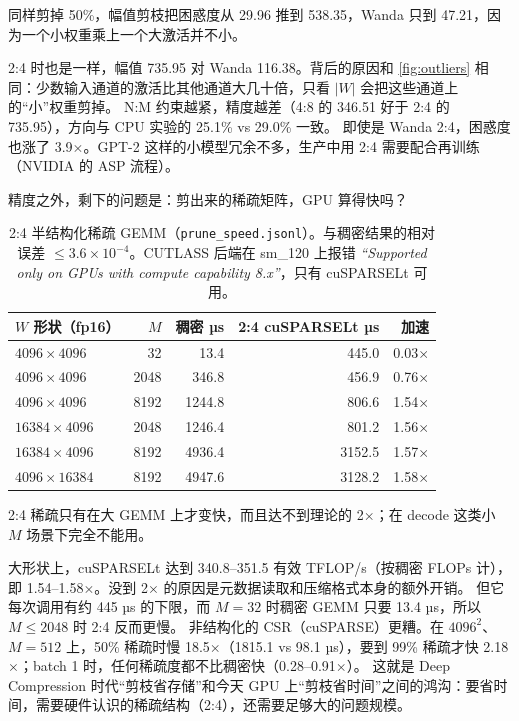 \documentclass[11pt,a4paper]{ctexart}
\begin{document}
\begin{findingbox}
同样剪掉 50\%，幅值剪枝把困惑度从 29.96 推到 538.35，Wanda 只到 47.21，因为一个小权重乘上一个大激活并不小。
\end{findingbox}

2:4 时也是一样，幅值 735.95 对 Wanda 116.38。背后的原因和 \cref{fig:outliers} 相同：少数输入通道的激活比其他通道大几十倍，只看 $|W|$ 会把这些通道上的“小”权重剪掉。
N:M 约束越紧，精度越差（4:8 的 346.51 好于 2:4 的 735.95），方向与 CPU 实验的 25.1\% vs 29.0\% 一致。
即使是 Wanda 2:4，困惑度也涨了 3.9$\times$。GPT-2 这样的小模型冗余不多，生产中用 2:4 需要配合再训练（NVIDIA 的 ASP 流程）。

精度之外，剩下的问题是：剪出来的稀疏矩阵，GPU 算得快吗？

\begin{table}[H]
\centering\small
\begin{tabular}{lrrrr}
\toprule
$W$ 形状（fp16） & $M$ & 稠密 µs & 2:4 cuSPARSELt µs & 加速 \\
\midrule
$4096\times4096$ & 32 & 13.4 & 445.0 & 0.03$\times$ \\
$4096\times4096$ & 2048 & 346.8 & 456.9 & 0.76$\times$ \\
$4096\times4096$ & 8192 & 1244.8 & 806.6 & 1.54$\times$ \\
$16384\times4096$ & 2048 & 1246.4 & 801.2 & 1.56$\times$ \\
$16384\times4096$ & 8192 & 4936.4 & 3152.5 & 1.57$\times$ \\
$4096\times16384$ & 8192 & 4947.6 & 3128.2 & 1.58$\times$ \\
\bottomrule
\end{tabular}
\caption{2:4 半结构化稀疏 GEMM（\texttt{prune\_speed.jsonl}）。与稠密结果的相对误差 $\le 3.6\times10^{-4}$。CUTLASS 后端在 sm\_120 上报错 \emph{“Supported only on GPUs with compute capability 8.x”}，只有 cuSPARSELt 可用。}
\end{table}

\begin{findingbox}
2:4 稀疏只有在大 GEMM 上才变快，而且达不到理论的 2$\times$；在 decode 这类小 $M$ 场景下完全不能用。
\end{findingbox}

大形状上，cuSPARSELt 达到 340.8--351.5 有效 TFLOP/s（按稠密 FLOPs 计），即 1.54--1.58$\times$。没到 2$\times$ 的原因是元数据读取和压缩格式本身的额外开销。
但它每次调用有约 445 µs 的下限，而 $M{=}32$ 时稠密 GEMM 只要 13.4 µs，所以 $M\le2048$ 时 2:4 反而更慢。
非结构化的 CSR（cuSPARSE）更糟。在 $4096^2$、$M{=}512$ 上，50\% 稀疏时慢 18.5$\times$（1815.1 vs 98.1 µs），要到 99\% 稀疏才快 2.18$\times$；batch 1 时，任何稀疏度都不比稠密快（0.28--0.91$\times$）。
这就是 Deep Compression 时代“剪枝省存储”和今天 GPU 上“剪枝省时间”之间的鸿沟：要省时间，需要硬件认识的稀疏结构（2:4），还需要足够大的问题规模。
\end{document}
